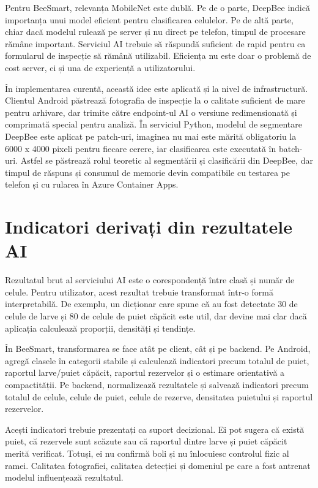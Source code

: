 Pentru BeeSmart, relevanța MobileNet este dublă. Pe de o parte, DeepBee indică importanța unui model eficient pentru clasificarea celulelor. Pe de altă parte, chiar dacă modelul rulează pe server și nu direct pe telefon, timpul de procesare rămâne important. Serviciul AI trebuie să răspundă suficient de rapid pentru ca formularul de inspecție să rămână utilizabil. Eficiența nu este doar o problemă de cost server, ci și una de experiență a utilizatorului.

În implementarea curentă, această idee este aplicată și la nivel de infrastructură. Clientul Android păstrează fotografia de inspecție la o calitate suficient de mare pentru arhivare, dar trimite către endpoint-ul AI o versiune redimensionată și comprimată special pentru analiză. În serviciul Python, modelul de segmentare DeepBee este aplicat pe patch-uri, imaginea nu mai este mărită obligatoriu la 6000 x 4000 pixeli pentru fiecare cerere, iar clasificarea este executată în batch-uri. Astfel se păstrează rolul teoretic al segmentării și clasificării din DeepBee, dar timpul de răspuns și consumul de memorie devin compatibile cu testarea pe telefon și cu rularea în Azure Container Apps.

\section{Indicatori derivați din rezultatele AI}

Rezultatul brut al serviciului AI este o corespondență între clasă și număr de celule. Pentru utilizator, acest rezultat trebuie transformat într-o formă interpretabilă. De exemplu, un dicționar care spune că au fost detectate 30 de celule de larve și 80 de celule de puiet căpăcit este util, dar devine mai clar dacă aplicația calculează proporții, densități și tendințe.

În BeeSmart, transformarea se face atât pe client, cât și pe backend. Pe Android,  agregă clasele în categorii stabile și calculează indicatori precum totalul de puiet, raportul larve/puiet căpăcit, raportul rezervelor și o estimare orientativă a compactității. Pe backend,  normalizează rezultatele și salvează indicatori precum totalul de celule, celule de puiet, celule de rezerve, densitatea puietului și raportul rezervelor.

Acești indicatori trebuie prezentați ca suport decizional. Ei pot sugera că există puiet, că rezervele sunt scăzute sau că raportul dintre larve și puiet căpăcit merită verificat. Totuși, ei nu confirmă boli și nu înlocuiesc controlul fizic al ramei. Calitatea fotografiei, calitatea detecției și domeniul pe care a fost antrenat modelul influențează rezultatul.

